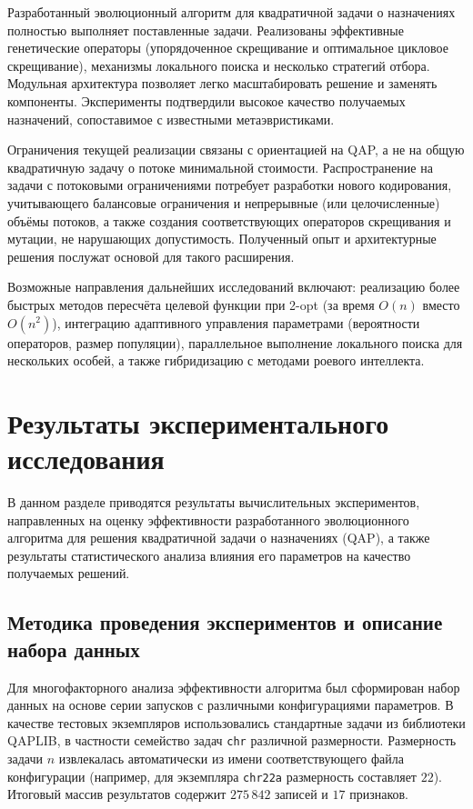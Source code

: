 \documentclass[732]{studrep}
\theoremstyle{nonumberplain}
\begin{document}
Разработанный эволюционный алгоритм для квадратичной задачи о назначениях полностью выполняет поставленные задачи. Реализованы эффективные генетические операторы (упорядоченное скрещивание и оптимальное цикловое скрещивание), механизмы локального поиска и несколько стратегий отбора. Модульная архитектура позволяет легко масштабировать решение и заменять компоненты. Эксперименты подтвердили высокое качество получаемых назначений, сопоставимое с известными метаэвристиками.

Ограничения текущей реализации связаны с ориентацией на QAP, а не на общую квадратичную задачу о потоке минимальной стоимости. Распространение на задачи с потоковыми ограничениями потребует разработки нового кодирования, учитывающего балансовые ограничения и непрерывные (или целочисленные) объёмы потоков, а также создания соответствующих операторов скрещивания и мутации, не нарушающих допустимость. Полученный опыт и архитектурные решения послужат основой для такого расширения.

Возможные направления дальнейших исследований включают: реализацию более быстрых методов пересчёта целевой функции при 2-opt (за время $O(n)$ вместо $O(n^2)$), интеграцию адаптивного управления параметрами (вероятности операторов, размер популяции), параллельное выполнение локального поиска для нескольких особей, а также гибридизацию с методами роевого интеллекта.

\chapter{Результаты экспериментального исследования}
\label{ch:results}

В данном разделе приводятся результаты вычислительных экспериментов, направленных на оценку эффективности разработанного эволюционного алгоритма для решения квадратичной задачи о назначениях (QAP), а также результаты статистического анализа влияния его параметров на качество получаемых решений.

\section{Методика проведения экспериментов и описание набора данных}
\label{sec:methodology}

Для многофакторного анализа эффективности алгоритма был сформирован набор данных на основе серии запусков с различными конфигурациями параметров. В качестве тестовых экземпляров использовались стандартные задачи из библиотеки QAPLIB, в частности семейство задач \texttt{chr} различной размерности. Размерность задачи \(n\) извлекалась автоматически из имени соответствующего файла конфигурации (например, для экземпляра \texttt{chr22a} размерность составляет \(22\)). Итоговый массив результатов содержит \(275\,842\) записей и \(17\) признаков.
\end{document}
